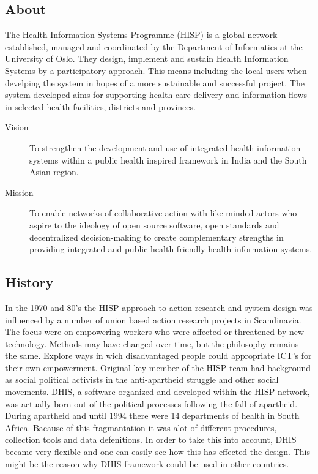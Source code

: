 \subsection{About}
The Health Information Systems Programme (HISP) is a global network established, managed and coordinated by the Department of Informatics at the University of Oslo.
They design, implement and sustain Health Information Systems by a participatory approach\cite{8}. 
This means including the local users when develping the system in hopes of a more sustainable and successful project.
The system developed aims for supporting health care delivery and information flows in selected health facilities, districts and provinces.
\begin{description}
\item[Vision] To strengthen the development and use of integrated health information systems within a public health inspired framework in India and the South Asian region\cite{9}.
\item[Mission] To enable networks of collaborative action with like-minded actors who aspire to the ideology of open source software, open standards and decentralized decision-making to create complementary strengths in providing integrated and public health friendly health information systems\cite{9}.
\end{description}
\subsection{History}
In the 1970 and 80's the HISP approach to action research and system design was influenced by a number of union based action research projects in Scandinavia.
The focus were on empowering workers who were affected or threatened by new technology.
Methods may have changed over time, but the philosophy remains the same.
Explore ways in wich disadvantaged people could appropriate ICT's for their own empowerment.
Original key member of the HISP team had background as social political activists in the anti-apartheid struggle and other social movements.
DHIS, a software organized and developed within the HISP network, was actually born out of the political processes following the fall of apartheid\cite{7}. 
During apartheid and until 1994 there were 14 departments of health in South Africa.
Bacause of this fragmantation it was alot of different procedures, collection tools and data defenitions. 
In order to take this into account, DHIS became very flexible and one can easily see how this has effected the design. 
This might be the reason why DHIS framework could be used in other countries.

